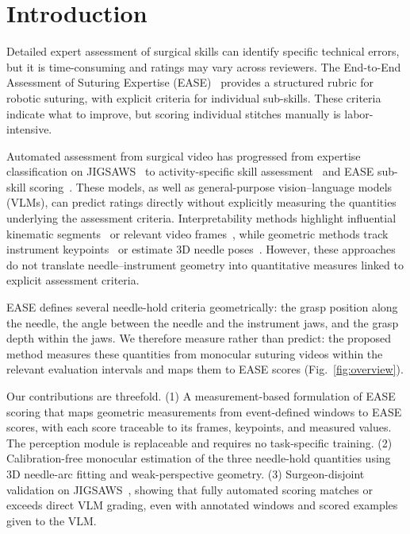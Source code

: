 \section{Introduction}
\label{sec:intro}

Detailed expert assessment of surgical skills can identify specific technical
errors, but it is time-consuming and ratings may vary across reviewers. The
End-to-End Assessment of Suturing Expertise (EASE)~\cite{Haque2022} provides
a structured rubric for robotic suturing, with explicit criteria for
individual sub-skills. These criteria indicate what to improve, but scoring
individual stitches manually is labor-intensive.

Automated assessment from surgical video has progressed from expertise
classification on JIGSAWS~\cite{Funke2019,Liu2021} to activity-specific skill
assessment~\cite{Kiyasseh2023} and EASE sub-skill
scoring~\cite{Cui2024,Deo2026}. These models, as well as general-purpose
vision--language models (VLMs), can predict ratings directly without
explicitly measuring the quantities underlying the assessment criteria.
Interpretability methods highlight influential kinematic
segments~\cite{IsmailFawaz2019} or relevant video
frames~\cite{Kiyasseh2023b}, while geometric methods track instrument
keypoints~\cite{Ghanekar2025} or estimate 3D needle
poses~\cite{Chiu2022,Li2024}. However, these approaches do not translate
needle--instrument geometry into quantitative measures linked to explicit
assessment criteria.

EASE defines several needle-hold criteria geometrically: the grasp position
along the needle, the angle between the needle and the instrument jaws, and
the grasp depth within the jaws. We therefore measure rather than predict:
the proposed method measures these quantities from monocular suturing videos
within the relevant evaluation intervals and maps them to EASE scores
(Fig.~\ref{fig:overview}).

Our contributions are threefold. (1) A measurement-based formulation of EASE
scoring that maps geometric measurements from event-defined windows to EASE
scores, with each score traceable to its frames, keypoints, and measured
values. The perception module is replaceable and requires no task-specific
training. (2) Calibration-free monocular estimation of the three needle-hold
quantities using 3D needle-arc fitting and weak-perspective geometry. (3)
Surgeon-disjoint validation on JIGSAWS~\cite{Gao2014}, showing that fully
automated scoring matches or exceeds direct VLM grading, even with
annotated windows and scored examples given to the VLM.
